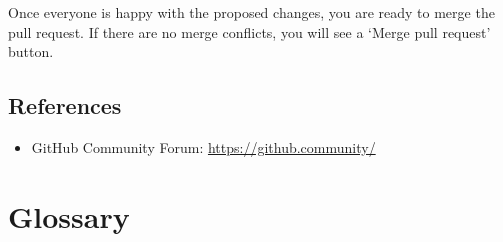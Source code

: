\documentclass[
]{book}
\providecommand{\tightlist}{%
  \setlength{\itemsep}{0pt}\setlength{\parskip}{0pt}}
\begin{document}
Once everyone is happy with the proposed changes, you are ready to merge the pull request. If there are no merge conflicts, you will see a `Merge pull request' button.

\hypertarget{references}{%
\section{References}\label{references}}

\begin{itemize}
\tightlist
\item
  GitHub Community Forum: \url{https://github.community/}
\end{itemize}

\hypertarget{glossary}{%
\chapter{Glossary}\label{glossary}}
\end{document}
